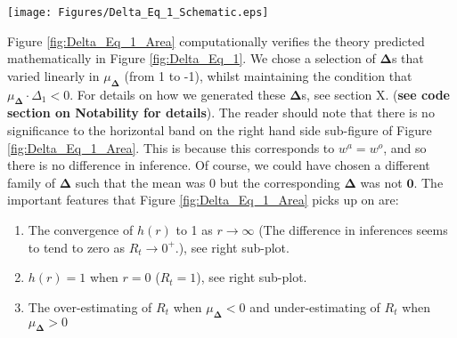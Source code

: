 \documentclass[10pt,journal,compsoc]{IEEEtran}
\begin{document}
\begin{minipage}{0.95\linewidth}
\centering
\texttt{[image: Figures/Delta\_Eq\_1\_Schematic.eps]}
\label{fig:Delta_Eq_1}
\end{minipage}

Figure \ref{fig:Delta_Eq_1_Area} computationally verifies the theory predicted mathematically in Figure \ref{fig:Delta_Eq_1}. We chose a selection of $\boldsymbol{\Delta}$s that varied linearly in $\mu_{\boldsymbol{\Delta}}$ (from 1 to -1), whilst maintaining the condition that $\mu_{\boldsymbol{\Delta}}\cdot \Delta_1 <0$. For details on how we generated these $\boldsymbol{\Delta}$s, see section X. (\textbf{see code section on Notability for details}). The reader should note that there is no significance to the horizontal band on the right hand side sub-figure of Figure \ref{fig:Delta_Eq_1_Area}. This is because this corresponds to $w^a = w^o$, and so there is no difference in inference. Of course, we could have chosen a different family of $\boldsymbol{\Delta}$ such that the mean was 0 but the corresponding $\boldsymbol{\Delta}$ was not $\boldsymbol{0}$. The important features that Figure \ref{fig:Delta_Eq_1_Area} picks up on are:

\begin{enumerate}
    \item The convergence of $h(r)$ to 1 as $r \rightarrow  \infty$ (The difference in inferences seems to tend to zero as $R_t \rightarrow  0^+$.), see right sub-plot.
    \item $h(r)=1$ when $r=0$ ($R_t=1$), see right sub-plot.
    \item The over-estimating of $R_t$ when $\mu_{\boldsymbol{\Delta}}<0$ and under-estimating of $R_t$ when $\mu_{\boldsymbol{\Delta}}>0$
    \end{enumerate}
   
\end{document}
